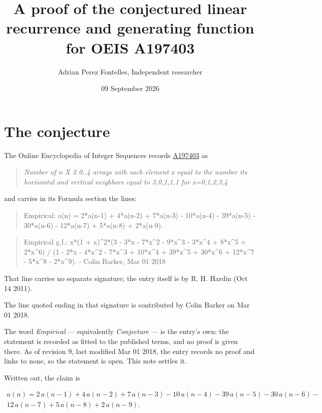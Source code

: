 \documentclass[11pt]{article}
\title{A proof of the conjectured linear recurrence and generating function for OEIS A197403}
\author{Adrian Perez Fontelles, Independent researcher}
\date{09 September 2026}
\theoremstyle{definition}
\begin{document}
\maketitle
\section{The conjecture}

The Online Encyclopedia of Integer Sequences records \href{https://oeis.org/A197403}{A197403} as

\begin{quote}\itshape Number of n X 2 0..4 arrays with each element x equal to the number its horizontal and vertical neighbors equal to 3,0,1,1,1 for x=0,1,2,3,4\end{quote}

and carries in its Formula section the lines:

\begin{quote}\ttfamily Empirical: a(n) = 2*a(n-1) + 4*a(n-2) + 7*a(n-3) - 10*a(n-4) - 39*a(n-5) - 30*a(n-6) - 12*a(n-7) + 5*a(n-8) + 2*a(n-9).\end{quote}

\begin{quote}\ttfamily Empirical g.f.: x*(1 + x)\textasciicircum{}2*(3 - 3*x - 7*x\textasciicircum{}2 - 9*x\textasciicircum{}3 - 3*x\textasciicircum{}4 + 8*x\textasciicircum{}5 + 2*x\textasciicircum{}6) / (1 - 2*x - 4*x\textasciicircum{}2 - 7*x\textasciicircum{}3 + 10*x\textasciicircum{}4 + 39*x\textasciicircum{}5 + 30*x\textasciicircum{}6 + 12*x\textasciicircum{}7 - 5*x\textasciicircum{}8 - 2*x\textasciicircum{}9). - Colin Barker, Mar 01 2018\end{quote}

That line carries no separate signature; the entry itself is by R. H. Hardin (Oct 14 2011).

The line quoted ending in that signature is contributed by Colin Barker on Mar 01 2018.

The word {\itshape Empirical} --- equivalently {\itshape Conjecture} --- is the entry's own: the statement is recorded as fitted to the published terms, and no proof is given there. As of revision 9, last modified Mar 01 2018, the entry records no proof and links to none, so the statement is open. This note settles it.

Written out, the claim is

\begin{multline*} a(n) = 2\,a(n-1) + 4\,a(n-2) + 7\,a(n-3) - 10\,a(n-4) - 39\,a(n-5) - 30\,a(n-6) - \\ 12\,a(n-7) + 5\,a(n-8) + 2\,a(n-9). \end{multline*}
\end{document}
